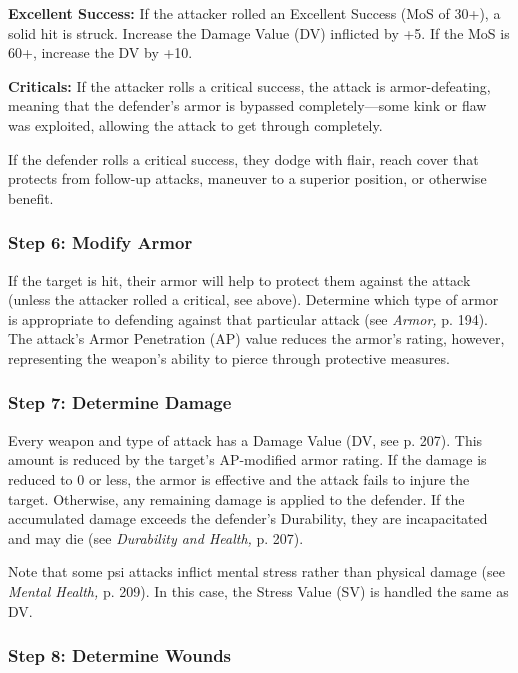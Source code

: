 \textbf{Excellent Success:} If the attacker rolled an Excellent
Success (MoS of 30+), a solid hit is struck.
Increase the Damage Value (DV) inflicted by +5. If 
the MoS is 60+, increase the DV by +10.

\textbf{Criticals:} If the attacker rolls a critical success, 
the attack is armor-defeating, meaning that the 
defender's armor is bypassed completely—some 
kink or flaw was exploited, allowing the attack to 
get through completely.

If the defender rolls a critical success, they 
dodge with flair, reach cover that protects from 
follow-up attacks, maneuver to a superior position, 
or otherwise benefit.

\subsubsection{Step 6: Modify Armor}

If the target is hit, their armor will help to protect
them against the attack (unless the attacker
rolled a critical, see above). Determine which type 
of armor is appropriate to defending against that 
particular attack (see \textit{Armor,} p. 194). The attack's 
Armor Penetration (AP) value reduces the armor's 
rating, however, representing the weapon's ability 
to pierce through protective measures.

\subsubsection{Step 7: Determine Damage}

Every weapon and type of attack has a Damage 
Value (DV, see p. 207). This amount is reduced 
by the target's AP-modified armor rating. If the 
damage is reduced to 0 or less, the armor is effective
and the attack fails to injure the target.
Otherwise, any remaining damage is applied to the 
defender. If the accumulated damage exceeds the 
defender's Durability, they are incapacitated and 
may die (see \textit{Durability and Health,} p. 207).

Note that some psi attacks inflict mental stress 
rather than physical damage (see \textit{Mental Health,} p. 
209). In this case, the Stress Value (SV) is handled 
the same as DV.

\subsubsection{Step 8: Determine Wounds}

